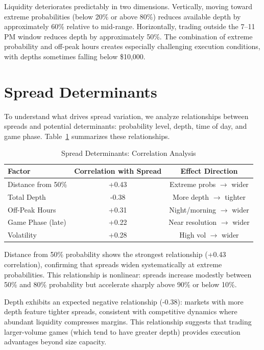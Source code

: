 Liquidity deteriorates predictably in two dimensions. Vertically, moving toward extreme probabilities (below 20\% or above 80\%) reduces available depth by approximately 60\% relative to mid-range. Horizontally, trading outside the 7--11 PM window reduces depth by approximately 50\%. The combination of extreme probability and off-peak hours creates especially challenging execution conditions, with depths sometimes falling below \$10,000.

\section{Spread Determinants}

To understand what drives spread variation, we analyze relationships between spreads and potential determinants: probability level, depth, time of day, and game phase. Table~\ref{tab:spread-regression} summarizes these relationships.

\begin{table}[H]
\centering
\caption{Spread Determinants: Correlation Analysis}
\label{tab:spread-regression}
\begin{tabular}{lcc}
\toprule
\textbf{Factor} & \textbf{Correlation with Spread} & \textbf{Effect Direction} \\
\midrule
Distance from 50\% & +0.43 & Extreme probs $\rightarrow$ wider \\
Total Depth & -0.38 & More depth $\rightarrow$ tighter \\
Off-Peak Hours & +0.31 & Night/morning $\rightarrow$ wider \\
Game Phase (late) & +0.22 & Near resolution $\rightarrow$ wider \\
Volatility & +0.28 & High vol $\rightarrow$ wider \\
\bottomrule
\end{tabular}
\end{table}

Distance from 50\% probability shows the strongest relationship (+0.43 correlation), confirming that spreads widen systematically at extreme probabilities. This relationship is nonlinear: spreads increase modestly between 50\% and 80\% probability but accelerate sharply above 90\% or below 10\%.

Depth exhibits an expected negative relationship (-0.38): markets with more depth feature tighter spreads, consistent with competitive dynamics where abundant liquidity compresses margins. This relationship suggests that trading larger-volume games (which tend to have greater depth) provides execution advantages beyond size capacity.

